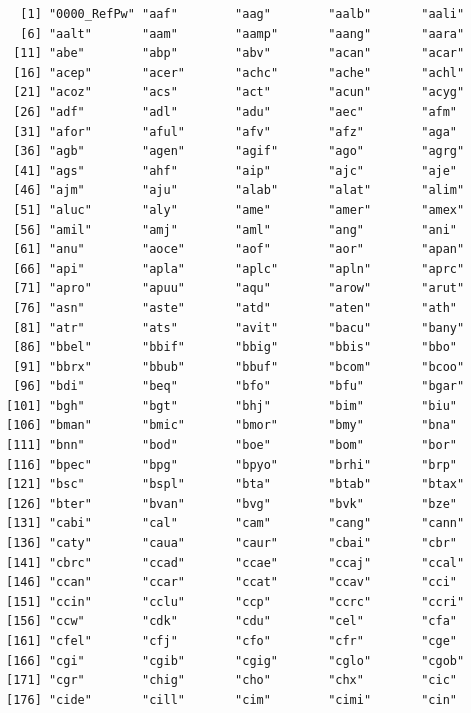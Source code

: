 \documentclass[
  letterpaper,
  DIV=11,
  numbers=noendperiod]{scrreprt}
\begin{document}
\begin{verbatim}
  [1] "0000_RefPw" "aaf"        "aag"        "aalb"       "aali"      
  [6] "aalt"       "aam"        "aamp"       "aang"       "aara"      
 [11] "abe"        "abp"        "abv"        "acan"       "acar"      
 [16] "acep"       "acer"       "achc"       "ache"       "achl"      
 [21] "acoz"       "acs"        "act"        "acun"       "acyg"      
 [26] "adf"        "adl"        "adu"        "aec"        "afm"       
 [31] "afor"       "aful"       "afv"        "afz"        "aga"       
 [36] "agb"        "agen"       "agif"       "ago"        "agrg"      
 [41] "ags"        "ahf"        "aip"        "ajc"        "aje"       
 [46] "ajm"        "aju"        "alab"       "alat"       "alim"      
 [51] "aluc"       "aly"        "ame"        "amer"       "amex"      
 [56] "amil"       "amj"        "aml"        "ang"        "ani"       
 [61] "anu"        "aoce"       "aof"        "aor"        "apan"      
 [66] "api"        "apla"       "aplc"       "apln"       "aprc"      
 [71] "apro"       "apuu"       "aqu"        "arow"       "arut"      
 [76] "asn"        "aste"       "atd"        "aten"       "ath"       
 [81] "atr"        "ats"        "avit"       "bacu"       "bany"      
 [86] "bbel"       "bbif"       "bbig"       "bbis"       "bbo"       
 [91] "bbrx"       "bbub"       "bbuf"       "bcom"       "bcoo"      
 [96] "bdi"        "beq"        "bfo"        "bfu"        "bgar"      
[101] "bgh"        "bgt"        "bhj"        "bim"        "biu"       
[106] "bman"       "bmic"       "bmor"       "bmy"        "bna"       
[111] "bnn"        "bod"        "boe"        "bom"        "bor"       
[116] "bpec"       "bpg"        "bpyo"       "brhi"       "brp"       
[121] "bsc"        "bspl"       "bta"        "btab"       "btax"      
[126] "bter"       "bvan"       "bvg"        "bvk"        "bze"       
[131] "cabi"       "cal"        "cam"        "cang"       "cann"      
[136] "caty"       "caua"       "caur"       "cbai"       "cbr"       
[141] "cbrc"       "ccad"       "ccae"       "ccaj"       "ccal"      
[146] "ccan"       "ccar"       "ccat"       "ccav"       "cci"       
[151] "ccin"       "cclu"       "ccp"        "ccrc"       "ccri"      
[156] "ccw"        "cdk"        "cdu"        "cel"        "cfa"       
[161] "cfel"       "cfj"        "cfo"        "cfr"        "cge"       
[166] "cgi"        "cgib"       "cgig"       "cglo"       "cgob"      
[171] "cgr"        "chig"       "cho"        "chx"        "cic"       
[176] "cide"       "cill"       "cim"        "cimi"       "cin"       

\end{verbatim}
\end{document}
